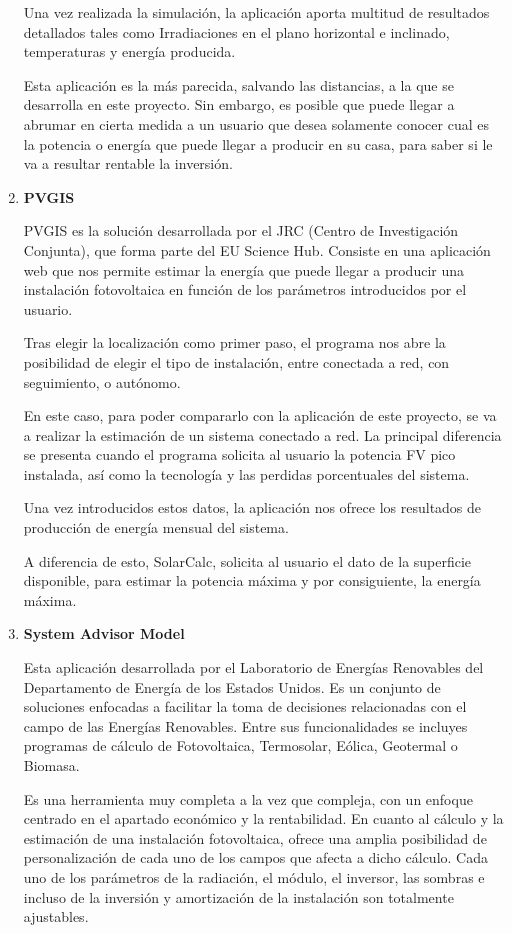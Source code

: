 \begin{enumerate}
Una vez realizada la simulación, la aplicación aporta multitud de resultados detallados tales como Irradiaciones en el plano horizontal e inclinado, temperaturas y energía producida.

Esta aplicación es la más parecida, salvando las distancias, a la que se desarrolla en este proyecto. Sin embargo, es posible que puede llegar a abrumar en cierta medida a un usuario que desea solamente conocer cual es la potencia o energía que puede llegar a producir en su casa, para saber si le va a resultar rentable la inversión.

\item \textbf{PVGIS} \cite{sota_pvgis}

PVGIS es la solución desarrollada por el JRC (Centro de Investigación Conjunta), que forma parte del EU Science Hub. Consiste en una aplicación web que nos permite estimar la energía que puede llegar a producir una instalación fotovoltaica en función de los parámetros introducidos por el usuario.

Tras elegir la localización como primer paso, el programa nos abre la posibilidad de elegir el tipo de instalación, entre conectada a red, con seguimiento, o autónomo.

En este caso, para poder compararlo con la aplicación de este proyecto, se va a realizar la estimación de un sistema conectado a red. La principal diferencia se presenta cuando el programa solicita al usuario la potencia FV pico instalada, así como la tecnología y las perdidas porcentuales del sistema.

Una vez introducidos estos datos, la aplicación nos ofrece los resultados de producción de energía mensual del sistema.

A diferencia de esto, SolarCalc, solicita al usuario el dato de la superficie disponible, para estimar la potencia máxima y por consiguiente, la energía máxima.

\item \textbf{System Advisor Model} \cite{sota_sam}

Esta aplicación desarrollada por el Laboratorio de Energías Renovables del Departamento de Energía de los Estados Unidos. Es un conjunto de soluciones enfocadas a facilitar la toma de decisiones relacionadas con el campo de las Energías Renovables. Entre sus funcionalidades se incluyes programas de cálculo de Fotovoltaica, Termosolar, Eólica, Geotermal o Biomasa.

Es una herramienta muy completa a la vez que compleja, con un enfoque centrado en el apartado económico y la rentabilidad. En cuanto al cálculo y la estimación de una instalación fotovoltaica, ofrece una amplia posibilidad de personalización de cada uno de los campos que afecta a dicho cálculo. Cada uno de los parámetros de la radiación, el módulo, el inversor, las sombras e incluso de la inversión y amortización de la instalación son totalmente ajustables.


\end{enumerate}
